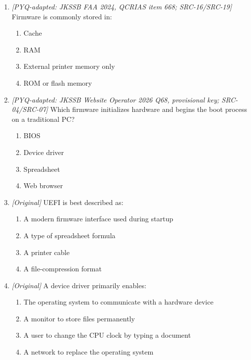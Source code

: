 \begin{enumerate}[label=\textbf{Q\arabic*.}, leftmargin=*]
\begin{enumerate}[label=\Alph*.]
    \item UEFI supports larger disks than legacy BIOS.
    \item A compiler loads the operating system at startup.
  \end{enumerate}
\item \textit{[PYQ-adapted: JKSSB FAA 2024, QCRIAS item 668; SRC-16/SRC-19]} Firmware is commonly stored in:
  \begin{enumerate}[label=\Alph*.]
\item Cache
   \item RAM
   \item External printer memory only
   \item ROM or flash memory
  \end{enumerate}

\item \textit{[PYQ-adapted: JKSSB Website Operator 2026 Q68, provisional key; SRC-04/SRC-07]} Which firmware initializes hardware and begins the boot process on a traditional PC?
  \begin{enumerate}[label=\Alph*.]
\item BIOS
   \item Device driver
   \item Spreadsheet
   \item Web browser
  \end{enumerate}

\item \textit{[Original]} UEFI is best described as:
  \begin{enumerate}[label=\Alph*.]
\item A modern firmware interface used during startup
   \item A type of spreadsheet formula
   \item A printer cable
   \item A file-compression format
  \end{enumerate}

\item \textit{[Original]} A device driver primarily enables:
  \begin{enumerate}[label=\Alph*.]
\item The operating system to communicate with a hardware device
   \item A monitor to store files permanently
   \item A user to change the CPU clock by typing a document
   \item A network to replace the operating system
  \end{enumerate}


\end{enumerate}
